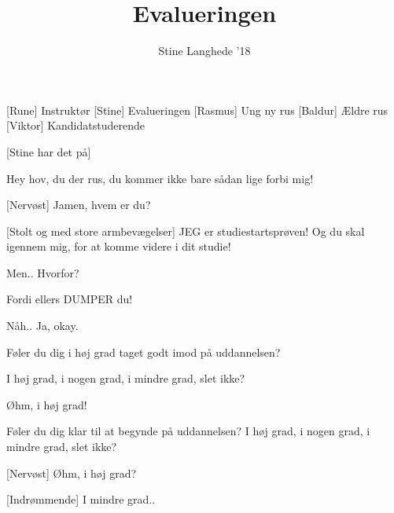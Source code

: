 \documentclass[a4paper,11pt]{article}
\title{Evalueringen}
\author{Stine Langhede ’18}
\begin{document}
\maketitle

\begin{roles}
[Rune] Instruktør
[Stine] Evalueringen
[Rasmus] Ung ny rus
[Baldur] Ældre rus
[Viktor] Kandidatstuderende
\end{roles}

\begin{props}
[Stine har det på]
\end{props}


\begin{sketch}

 Hey hov, du der rus, du kommer ikke bare sådan lige forbi mig!

[Nervøst] Jamen, hvem er du?

[Stolt og med store armbevægelser] JEG er studiestartsprøven! Og du skal igennem mig, for at komme videre i dit studie!

 Men.. Hvorfor?

 Fordi ellers DUMPER du!

 Nåh.. Ja, okay.


 Føler du dig i høj grad taget godt imod på uddannelsen?


 I høj grad, i nogen grad, i mindre grad, slet ikke?

 Øhm, i høj grad!

 Føler du dig klar til at begynde på uddannelsen? I høj grad, i nogen grad, i mindre grad, slet ikke?

[Nervøst] Øhm, i høj grad?


[Indrømmende] I mindre grad..


\end{sketch}
\end{document}
